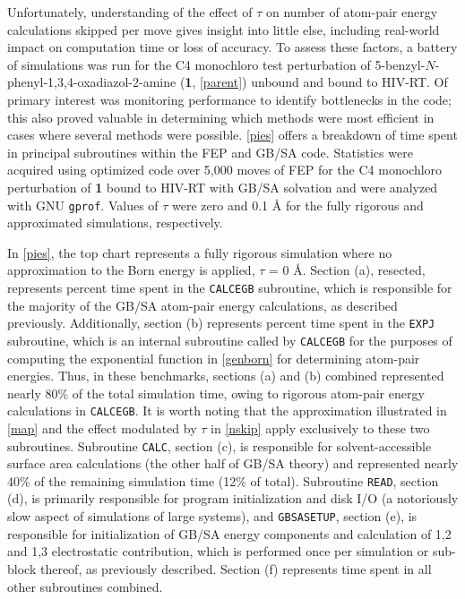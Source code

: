 \documentclass[12pt]{report}
\begin{document}
Unfortunately, understanding of the effect of $\tau$ on number of atom-pair energy calculations skipped per move gives insight into little else, including real-world impact on computation time or loss of accuracy. To assess these factors, a battery of simulations was run for the C4 monochloro test perturbation of 5-benzyl-$N$-phenyl-1,3,4-oxadiazol-2-amine (\textbf{1}, \cref{parent}) unbound and bound to HIV-RT. Of primary interest was monitoring performance to identify bottlenecks in the code; this also proved valuable in determining which methods were most efficient in cases where several methods were possible. \cref{pies} offers a breakdown of time spent in principal subroutines within the FEP and GB/SA code. Statistics were acquired using optimized code over 5,000 moves of FEP for the C4 monochloro perturbation of \textbf{1} bound to HIV-RT with GB/SA solvation and were analyzed with GNU \texttt{gprof}. Values of $\tau$ were zero and 0.1 \AA{} for the fully rigorous and approximated simulations, respectively.

In \cref{pies}, the top chart represents a fully rigorous simulation where no approximation to the Born energy is applied, $\tau$ = 0 \AA. Section (a), resected, represents percent time spent in the {\tt CALCEGB} subroutine, which is responsible for the majority of the GB/SA atom-pair energy calculations, as described previously. Additionally, section (b) represents percent time spent in the {\tt EXPJ} subroutine, which is an internal subroutine called by {\tt CALCEGB} for the purposes of computing the exponential function in \cref{genborn} for determining atom-pair energies. Thus, in these benchmarks, sections (a) and (b) combined represented nearly 80\% of the total simulation time, owing to rigorous atom-pair energy calculations in {\tt CALCEGB}. It is worth noting that the approximation illustrated in \cref{map} and the effect modulated by $\tau$ in \cref{nskip} apply exclusively to these two subroutines. Subroutine {\tt CALC}, section (c), is responsible for solvent-accessible surface area calculations (the other half of GB/SA theory) and represented nearly 40\% of the remaining simulation time (12\% of total). Subroutine {\tt READ}, section (d), is primarily responsible for program initialization and disk I/O (a notoriously slow aspect of simulations of large systems), and {\tt GBSASETUP}, section (e), is responsible for initialization of GB/SA energy components and calculation of 1,2 and 1,3 electrostatic contribution, which is performed once per simulation or sub-block thereof, as previously described. Section (f) represents time spent in all other subroutines combined.
\end{document}
